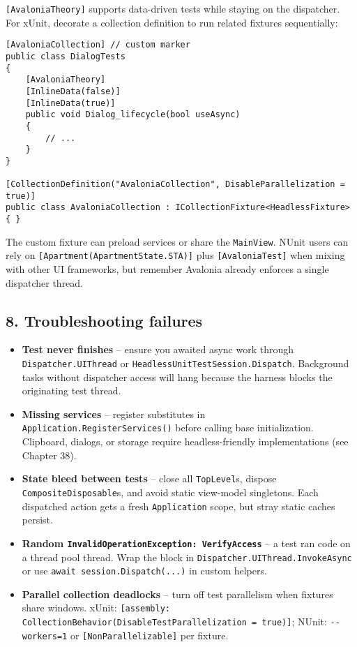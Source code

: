 \passthrough{\lstinline![AvaloniaTheory]!} supports data-driven tests
while staying on the dispatcher. For xUnit, decorate a collection
definition to run related fixtures sequentially:

\begin{lstlisting}
[AvaloniaCollection] // custom marker
public class DialogTests
{
    [AvaloniaTheory]
    [InlineData(false)]
    [InlineData(true)]
    public void Dialog_lifecycle(bool useAsync)
    {
        // ...
    }
}

[CollectionDefinition("AvaloniaCollection", DisableParallelization = true)]
public class AvaloniaCollection : ICollectionFixture<HeadlessFixture> { }
\end{lstlisting}

The custom fixture can preload services or share the
\passthrough{\lstinline!MainView!}. NUnit users can rely on
\passthrough{\lstinline![Apartment(ApartmentState.STA)]!} plus
\passthrough{\lstinline![AvaloniaTest]!} when mixing with other UI
frameworks, but remember Avalonia already enforces a single dispatcher
thread.

\subsection{8. Troubleshooting failures}\label{troubleshooting-failures}

\begin{itemize}
\tightlist
\item
  \textbf{Test never finishes} -- ensure you awaited async work through
  \passthrough{\lstinline!Dispatcher.UIThread!} or
  \passthrough{\lstinline!HeadlessUnitTestSession.Dispatch!}. Background
  tasks without dispatcher access will hang because the harness blocks
  the originating test thread.
\item
  \textbf{Missing services} -- register substitutes in
  \passthrough{\lstinline!Application.RegisterServices()!} before
  calling base initialization. Clipboard, dialogs, or storage require
  headless-friendly implementations (see Chapter 38).
\item
  \textbf{State bleed between tests} -- close all
  \passthrough{\lstinline!TopLevel!}s, dispose
  \passthrough{\lstinline!CompositeDisposable!}s, and avoid static
  view-model singletons. Each dispatched action gets a fresh
  \passthrough{\lstinline!Application!} scope, but stray static caches
  persist.
\item
  \textbf{Random
  \passthrough{\lstinline!InvalidOperationException: VerifyAccess!}} --
  a test ran code on a thread pool thread. Wrap the block in
  \passthrough{\lstinline!Dispatcher.UIThread.InvokeAsync!} or use
  \passthrough{\lstinline!await session.Dispatch(...)!} in custom
  helpers.
\item
  \textbf{Parallel collection deadlocks} -- turn off test parallelism
  when fixtures share windows. xUnit:
  \passthrough{\lstinline![assembly: CollectionBehavior(DisableTestParallelization = true)]!};
  NUnit: \passthrough{\lstinline!--workers=1!} or
  \passthrough{\lstinline![NonParallelizable]!} per fixture.
\end{itemize}

